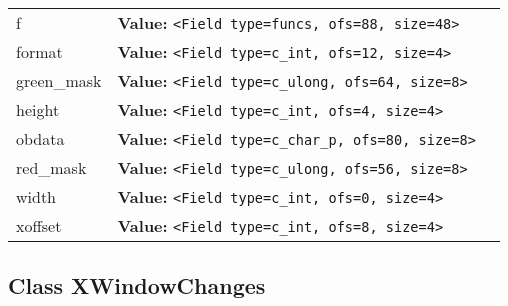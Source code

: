 \begin{longtable}{|p{\varnamewidth}|p{\vardescrwidth}|l}
\cline{1-2}
\raggedright f\- & \raggedright \textbf{Value:} 
{\tt {\textless}Field type=funcs, ofs=88, size=48{\textgreater}}&\\
\cline{1-2}
\raggedright f\-o\-r\-m\-a\-t\- & \raggedright \textbf{Value:} 
{\tt {\textless}Field type=c\_int, ofs=12, size=4{\textgreater}}&\\
\cline{1-2}
\raggedright g\-r\-e\-e\-n\-\_\-m\-a\-s\-k\- & \raggedright \textbf{Value:} 
{\tt {\textless}Field type=c\_ulong, ofs=64, size=8{\textgreater}}&\\
\cline{1-2}
\raggedright h\-e\-i\-g\-h\-t\- & \raggedright \textbf{Value:} 
{\tt {\textless}Field type=c\_int, ofs=4, size=4{\textgreater}}&\\
\cline{1-2}
\raggedright o\-b\-d\-a\-t\-a\- & \raggedright \textbf{Value:} 
{\tt {\textless}Field type=c\_char\_p, ofs=80, size=8{\textgreater}}&\\
\cline{1-2}
\raggedright r\-e\-d\-\_\-m\-a\-s\-k\- & \raggedright \textbf{Value:} 
{\tt {\textless}Field type=c\_ulong, ofs=56, size=8{\textgreater}}&\\
\cline{1-2}
\raggedright w\-i\-d\-t\-h\- & \raggedright \textbf{Value:} 
{\tt {\textless}Field type=c\_int, ofs=0, size=4{\textgreater}}&\\
\cline{1-2}
\raggedright x\-o\-f\-f\-s\-e\-t\- & \raggedright \textbf{Value:} 
{\tt {\textless}Field type=c\_int, ofs=8, size=4{\textgreater}}&\\
\cline{1-2}
\end{longtable}



\subsection{Class XWindowChanges}

